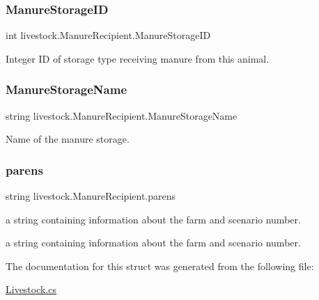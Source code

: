 \subsubsection{\texorpdfstring{ManureStorageID}{ManureStorageID}}
{\footnotesize\ttfamily int livestock.\+Manure\+Recipient.\+Manure\+Storage\+ID}



Integer ID of storage type receiving manure from this animal. 

\mbox{\label{structlivestock_1_1_manure_recipient_a7a2d6c5743a5b9ab2686c43a3127042e}} 
\subsubsection{\texorpdfstring{ManureStorageName}{ManureStorageName}}
{\footnotesize\ttfamily string livestock.\+Manure\+Recipient.\+Manure\+Storage\+Name}



Name of the manure storage. 

\mbox{\label{structlivestock_1_1_manure_recipient_adb66d99bb1b3cf89215d89acca36d3e2}} 
\subsubsection{\texorpdfstring{parens}{parens}}
{\footnotesize\ttfamily string livestock.\+Manure\+Recipient.\+parens}



a string containing information about the farm and scenario number. 

a string containing information about the farm and scenario number. 

The documentation for this struct was generated from the following file\+:\begin{DoxyCompactItemize}
\item 
\mbox{\hyperlink{_livestock_8cs}{Livestock.\+cs}}\end{DoxyCompactItemize}
